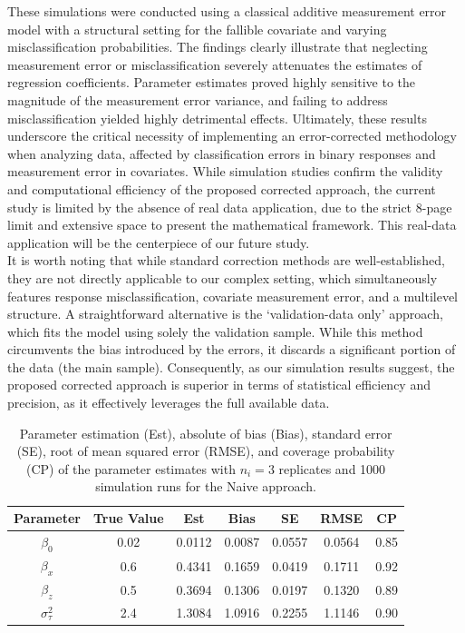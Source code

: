 \documentclass[twoside]{article}
\begin{document}
These simulations were conducted using a classical additive measurement error model with a structural setting for the fallible covariate and varying misclassification probabilities. The findings clearly illustrate that neglecting measurement error or misclassification severely attenuates the estimates of regression coefficients. Parameter estimates proved highly sensitive to the magnitude of the measurement error variance, and failing to address misclassification yielded highly detrimental effects. Ultimately, these results underscore the critical necessity of implementing an error-corrected methodology when analyzing data, affected by classification errors in binary responses and measurement error in covariates. While simulation studies confirm the validity and computational efficiency of the proposed corrected approach, the current study is limited by the absence of real data application, due to the strict 8-page limit and extensive space to present the mathematical framework. This real-data application will be the centerpiece of our future study.\\
It is worth noting that while standard correction methods are well-established, they are not directly applicable to our complex setting, which simultaneously features response misclassification, covariate measurement error, and a multilevel structure. A straightforward alternative is the ‘validation-data only’ approach, which fits the model using solely the validation sample. While this method circumvents the bias introduced by the errors, it discards a significant portion of the data (the main sample). Consequently, as our simulation results suggest, the proposed corrected approach is superior in terms of statistical efficiency and precision, as it effectively leverages the full available data.
\begin{table}[h]
\caption{\footnotesize{Parameter estimation (Est), absolute of bias (Bias), standard error (SE), root of mean squared error (RMSE), and coverage probability (CP) of the parameter estimates with $n_i=3$ replicates and 1000 simulation runs for the Naive  approach.}\label{tab1}} 
\centering
 \begin{tabular}{ccccccc}
\hline 
Parameter &True Value &  Est & Bias & SE & RMSE & CP
\\\hline
$\beta_{0}$&0.02 & 0.0112 & 0.0087& 0.0557 & 0.0564&0.85  \\
$\beta_{x}$&0.6&0.4341&0.1659&0.0419&0.1711&0.92 \\ 
$\beta_{z}$&0.5&0.3694&0.1306&0.0197&0.1320&0.89\\
$\sigma_{\tau}^2$&2.4&1.3084&1.0916&0.2255&1.1146&0.90\\
\hline
\end{tabular}
\end{table}
\end{document}
